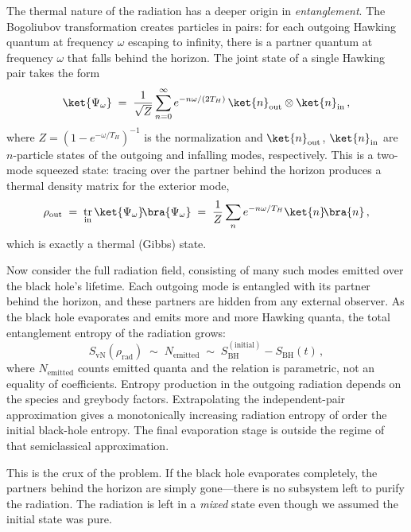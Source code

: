 \documentclass[11pt,letterpaper]{article}
\theoremstyle{plain}
\theoremstyle{definition}
\theoremstyle{remark}
\DeclareMathOperator{\tr}{tr}
\begin{document}
The thermal nature of the radiation has a deeper origin in
\emph{entanglement}.  The Bogoliubov transformation creates particles
in pairs: for each outgoing Hawking quantum at frequency $\omega$
escaping to infinity, there is a partner quantum at frequency $\omega$
that falls behind the horizon.  The joint state of a single Hawking
pair takes the form
\begin{equation}\label{eq03:hawking_pair}
  \ket{\Psi_{\omega}} \;=\;
  \frac{1}{\sqrt{Z}} \sum_{n=0}^{\infty}
  e^{-n\omega/(2T_{H})}\,
  \ket{n}_{\mathrm{out}} \otimes \ket{n}_{\mathrm{in}}\,,
\end{equation}
where $Z = (1 - e^{-\omega/T_{H}})^{-1}$ is the normalization and
$\ket{n}_{\mathrm{out}}$, $\ket{n}_{\mathrm{in}}$ are $n$-particle
states of the outgoing and infalling modes, respectively.  This is a
two-mode squeezed state: tracing over the partner behind the horizon
produces a thermal density matrix for the exterior mode,
\begin{equation}\label{eq03:rho_single_mode}
  \rho_{\mathrm{out}} \;=\; \tr_{\mathrm{in}} \ket{\Psi_{\omega}}
  \!\bra{\Psi_{\omega}}
  \;=\; \frac{1}{Z} \sum_{n} e^{-n\omega/T_{H}} \ket{n}\!\bra{n}\,,
\end{equation}
which is exactly a thermal (Gibbs) state.

Now consider the full radiation field, consisting of many such modes
emitted over the black hole's lifetime.  Each outgoing mode is
entangled with its partner behind the horizon, and these partners are
hidden from any external observer.  As the black hole evaporates and
emits more and more Hawking quanta, the total entanglement entropy of
the radiation grows:
\begin{equation}\label{eq03:svn_monotonic}
  S_{\mathrm{vN}}(\rho_{\mathrm{rad}}) \;\sim\; N_{\mathrm{emitted}}
  \;\sim\; S_{\mathrm{BH}}^{(\mathrm{initial})} - S_{\mathrm{BH}}(t)\,,
\end{equation}
where $N_{\mathrm{emitted}}$ counts emitted quanta and the relation is
parametric, not an equality of coefficients. Entropy production in the outgoing
radiation depends on the species and greybody factors. Extrapolating the
independent-pair approximation gives a monotonically increasing radiation
entropy of order the initial black-hole entropy. The final evaporation stage
is outside the regime of that semiclassical approximation.

This is the crux of the problem.  If the black hole evaporates
completely, the partners behind the horizon are simply gone---there is
no subsystem left to purify the radiation.  The radiation is left in a
\emph{mixed} state even though we assumed the initial state was pure.
\end{document}

